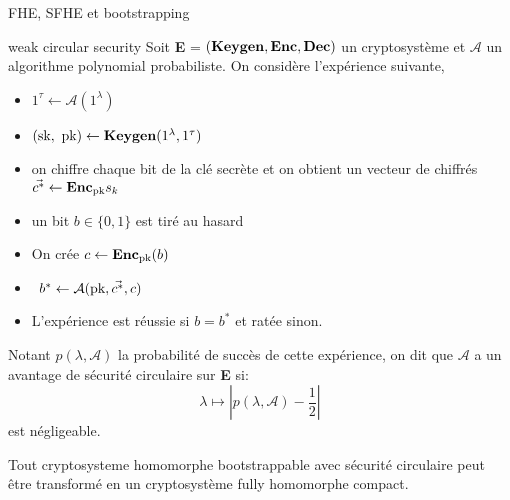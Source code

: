 \begin{section}{FHE, SFHE et bootstrapping}
\begin{definition}{weak circular security}
\label{def:circular}
Soit \textbf{E} = $(\text{\textbf{Keygen}}, \text{\textbf{Enc}}, \text{\textbf{Dec}})$ un cryptosystème et $\mathcal{A}$ un
algorithme polynomial probabiliste. 
On considère l'expérience suivante, 
\begin{itemize}
\item $1^\tau \leftarrow \mathcal{A}(1^\lambda)$ 
\item $(\sk, \pk) \leftarrow \Keygen(1^\lambda, 1^\tau)$
\item on chiffre chaque bit de la clé secrète et on obtient un vecteur de
chiffrés $\vec{c^*} \leftarrow \text{\textbf{Enc}}_{\text{pk}}{s_k}$
\item un bit $b\in \{0,1\}$ est tiré au hasard
\item On crée $c \leftarrow \text{\textbf{Enc}}_{\text{pk}}(b)$ 
\item $b^* \leftarrow \mathcal{A}(\text{pk}, \vec{c^*}, c)$
\item L'expérience est réussie si $b = b^*$ et ratée sinon.
\end{itemize}
Notant $p(\lambda, \mathcal{A})$ la probabilité de succès de cette expérience, on dit
que $\mathcal{A}$ a un avantage de sécurité circulaire sur \textbf{E} si:
\[\lambda \mapsto |p(\lambda, \mathcal{A}) - \frac{1}{2}| \]
est négligeable.
\end{definition}

\begin{thm}
Tout cryptosysteme homomorphe bootstrappable avec sécurité circulaire peut être transformé en un 
cryptosystème fully homomorphe compact.
\end{thm}
\end{section}
